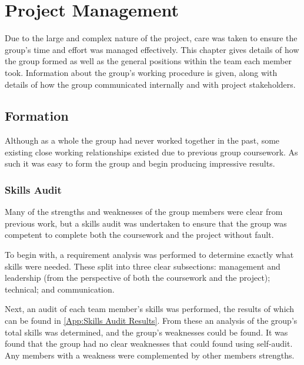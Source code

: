 \chapter{Project Management}
\label{Chapter: Project Management}

\begin{preamble}
	Due to the large and complex nature of the project, care was taken to ensure the group's time and effort was managed effectively. This chapter gives details of how the group formed as well as the general positions within the team each member took. Information about the group's working procedure is given, along with details of how the group communicated internally and with project stakeholders.
\end{preamble}

\section{Formation}
\label{Section:Formation}

Although as a whole the group had never worked together in the past, some existing close working relationships existed due to previous group coursework. As such it was easy to form the group and begin producing impressive results.

\subsection{Skills Audit}
\label{Section:Skills Audit}

Many of the strengths and weaknesses of the group members were clear from previous work, but a skills audit was undertaken to ensure that the group was competent to complete both the coursework and the project without fault.

To begin with, a requirement analysis was performed to determine exactly what skills were needed. These split into three clear subsections: management and leadership (from the perspective of both the coursework and the project); technical; and communication.

Next, an audit of each team member's skills was performed, the results of which can be found in \cref{App:Skills Audit Results}. From these an analysis of the group's total skills was determined, and the group's weaknesses could be found. It was found that the group had no clear weaknesses that could found using self-audit. Any members with a weakness were complemented by other members strengths.


